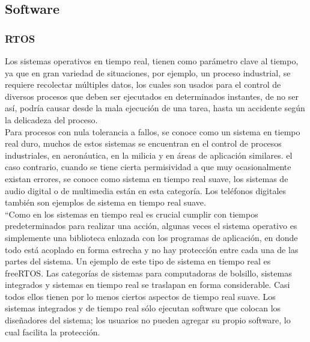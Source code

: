 
\subsection{Software}

\subsubsection{RTOS}

Los sistemas operativos en tiempo real, tienen como parámetro clave al tiempo, ya que en gran variedad de situaciones, por ejemplo, un proceso industrial, se requiere recolectar múltiples datos, los cuales son usados para el control de diversos procesos que deben ser ejecutados en determinados instantes, de no ser así, podría causar desde la mala ejecución de una tarea, hasta un accidente según la delicadeza del proceso.\\ 

Para procesos con nula tolerancia a fallos, se conoce como un sistema en tiempo real duro, muchos de estos sistemas se encuentran en el control de procesos industriales, en aeronáutica, en la milicia y en áreas de aplicación similares. el caso contrario, cuando se tiene cierta permisividad a que muy ocasionalmente existan errores, se conoce como sistema en tiempo real suave, los sistemas de audio digital o de multimedia están en esta categoría. Los teléfonos digitales también son ejemplos de sistema en tiempo real suave. \cite{SO} \\

``Como en los sistemas en tiempo real es crucial cumplir con tiempos predeterminados para realizar una acción, algunas veces el sistema operativo es simplemente una biblioteca enlazada con los programas de aplicación, en donde todo está acoplado en forma estrecha y no hay protección entre cada una de las partes del sistema. Un ejemplo de este tipo de sistema en tiempo real es freeRTOS.  Las categorías de sistemas para computadoras de bolsillo, sistemas integrados y sistemas en tiempo real se traslapan en forma considerable. Casi todos ellos tienen por lo menos ciertos aspectos de tiempo real suave. Los sistemas integrados y de tiempo real sólo ejecutan software que colocan los diseñadores del sistema; los usuarios no pueden agregar su propio software, lo cual facilita la protección. \\

